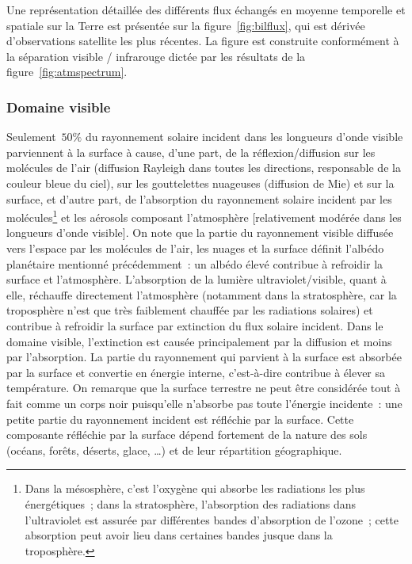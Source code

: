 \sk
Une représentation détaillée des différents flux échangés en moyenne temporelle et spatiale sur la Terre est présentée sur la figure~\ref{fig:bilflux}, qui est dérivée d'observations satellite les plus récentes. La figure est construite conformément à la séparation visible / infrarouge dictée par les résultats de la figure~\ref{fig:atmspectrum}. 

\sk
\subsubsection{Domaine visible}

\sk
Seulement~$50\%$ du rayonnement solaire incident dans les longueurs d'onde visible parviennent à la surface à cause, d'une part, de la réflexion/diffusion sur les molécules de l'air (diffusion Rayleigh dans toutes les directions, responsable de la couleur bleue du ciel), sur les gouttelettes nuageuses (diffusion de Mie) et sur la surface, et d'autre part, de l'absorption du rayonnement solaire incident par les molécules\footnote{Dans la mésosphère, c'est l'oxygène qui absorbe les radiations les plus énergétiques~; dans la stratosphère, l'absorption des radiations dans l’ultraviolet est assurée par différentes bandes d'absorption de l'ozone~; cette absorption peut avoir lieu dans certaines bandes jusque dans la troposphère.} et les aérosols composant l'atmosphère [relativement modérée dans les longueurs d'onde visible]. On note que la partie du rayonnement visible diffusée vers l'espace par les molécules de l'air, les nuages et la surface définit l'albédo planétaire mentionné précédemment~: un albédo élevé contribue à refroidir la surface et l'atmosphère. L'absorption de la lumière ultraviolet/visible, quant à elle, réchauffe directement l'atmosphère (notamment dans la stratosphère, car la troposphère n'est que très faiblement chauffée par les radiations solaires) et contribue à refroidir la surface par extinction du flux solaire incident. Dans le domaine visible, l'extinction est causée principalement par la diffusion et moins par l'absorption. La partie du rayonnement qui parvient à la surface est absorbée par la surface et convertie en énergie interne, c'est-à-dire contribue à élever sa température. On remarque que la surface terrestre ne peut être considérée tout à fait comme un corps noir puisqu'elle n'absorbe pas toute l'énergie incidente~: une petite partie du rayonnement incident est réfléchie par la surface. Cette composante réfléchie par la surface dépend fortement de la nature des sols (océans, forêts, déserts, glace, \ldots) et de leur répartition géographique.

